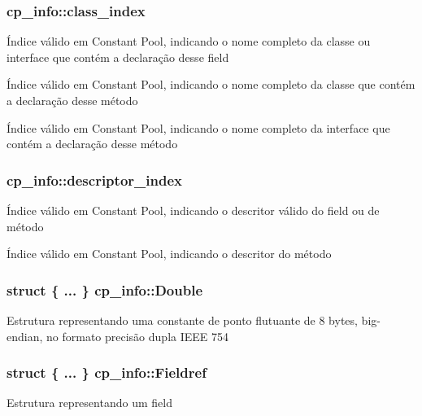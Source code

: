 \subsubsection[{\texorpdfstring{class\+\_\+index}{class_index}}]{ cp\+\_\+info\+::class\+\_\+index}\hypertarget{structcp__info_a1c7c3f3e2f9a620669b5f5cc51249ef8}{}\label{structcp__info_a1c7c3f3e2f9a620669b5f5cc51249ef8}
Índice válido em Constant Pool, indicando o nome completo da classe ou interface que contém a declaração desse field

Índice válido em Constant Pool, indicando o nome completo da classe que contém a declaração desse método

Índice válido em Constant Pool, indicando o nome completo da interface que contém a declaração desse método 
\subsubsection[{\texorpdfstring{descriptor\+\_\+index}{descriptor_index}}]{ cp\+\_\+info\+::descriptor\+\_\+index}\hypertarget{structcp__info_a35ec31f117bf83ef9aef6100822f1141}{}\label{structcp__info_a35ec31f117bf83ef9aef6100822f1141}
Índice válido em Constant Pool, indicando o descritor válido do field ou de método

Índice válido em Constant Pool, indicando o descritor do método 
\subsubsection[{\texorpdfstring{Double}{Double}}]{\setlength{\rightskip}{0pt plus 5cm}struct \{ ... \}   cp\+\_\+info\+::\+Double}\hypertarget{structcp__info_a936ea5aa3e0976dd8ee7e264e55b7470}{}\label{structcp__info_a936ea5aa3e0976dd8ee7e264e55b7470}
Estrutura representando uma constante de ponto flutuante de 8 bytes, big-\/endian, no formato precisão dupla I\+E\+EE 754 
\subsubsection[{\texorpdfstring{Fieldref}{Fieldref}}]{\setlength{\rightskip}{0pt plus 5cm}struct \{ ... \}   cp\+\_\+info\+::\+Fieldref}\hypertarget{structcp__info_a9294f4a6ae7fb7a705ca3d01f4eb16d9}{}\label{structcp__info_a9294f4a6ae7fb7a705ca3d01f4eb16d9}
Estrutura representando um field 
